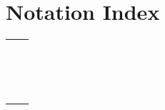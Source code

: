 \documentclass{acm_proc_article-sp}
\begin{document}
\section{Notation Index}
\begin{table}[htbp]
\small
\begin{tabular}{ll}
& \\
& \\
& \\
& \\
& \\
& \\
&\\
& \\
&\\
&\\
& \\
& \\
& \\
& \\
& \\
\end{tabular}
\end{table}
\end{document}
